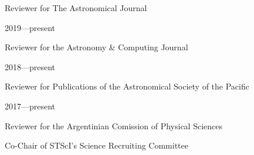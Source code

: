 \documentclass[12pt, a4paper]{article} %
\begin{document}
\vspace{0.2cm}

\begin{minipage}[t]{0.7\textwidth}
\begin{flushleft}%
  \setlength{\leftskip}{0.2cm}%
Reviewer for The Astronomical Journal
\end{flushleft}
\end{minipage}
\begin{minipage}[t]{0.3\textwidth}
\hfill 2019---present
\end{minipage}

\vspace{0.2cm}

\begin{minipage}[t]{0.7\textwidth}
\begin{flushleft}%
  \setlength{\leftskip}{0.2cm}%
Reviewer for the Astronomy \& Computing Journal
\end{flushleft}
\end{minipage}
\begin{minipage}[t]{0.3\textwidth}
\hfill 2018---present
\end{minipage}

\vspace{0.2cm}

\begin{minipage}[t]{0.7\textwidth}
\begin{flushleft}%
  \setlength{\leftskip}{0.2cm}%
Reviewer for Publications of the Astronomical Society of the Pacific 
\end{flushleft}
\end{minipage}
\begin{minipage}[t]{0.3\textwidth}
\hfill 2017---present
\end{minipage}

\vspace{0.2cm}

\begin{minipage}[t]{0.7\textwidth}
\begin{flushleft}%
  \setlength{\leftskip}{0.2cm}%
Reviewer for the Argentinian Comission of Physical Sciences
\end{flushleft}
\end{minipage}
\begin{minipage}[t]{0.3\textwidth}
\end{minipage}

\vspace{0.2cm}

\begin{minipage}[t]{0.7\textwidth}
\begin{flushleft}%
  \setlength{\leftskip}{0.2cm}%
Co-Chair of STScI's Science Recruiting Committee
\end{flushleft}
\end{minipage}
\begin{minipage}[t]{0.3\textwidth}
\hfill 
\end{minipage}
\end{document}
